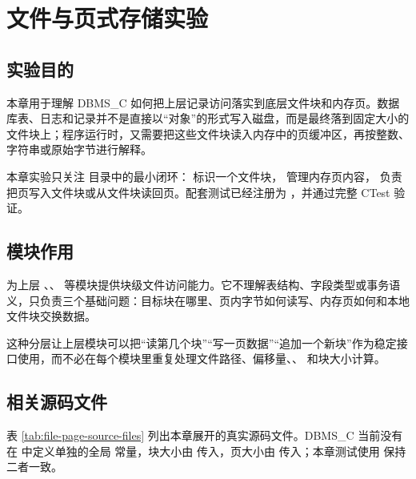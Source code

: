 \chapter{文件与页式存储实验}
\label{chap:file-page}

\section{实验目的}
\label{sec:file-page-purpose}

本章用于理解 DBMS\_C 如何把上层记录访问落实到底层文件块和内存页。数据库表、日志和记录并不是直接以“对象”的形式写入磁盘，而是最终落到固定大小的文件块上；程序运行时，又需要把这些文件块读入内存中的页缓冲区，再按整数、字符串或原始字节进行解释。

本章实验只关注  目录中的最小闭环： 标识一个文件块， 管理内存页内容， 负责把页写入文件块或从文件块读回页。配套测试已经注册为 ，并通过完整 CTest 验证。

\section{模块作用}
\label{sec:file-page-role}

 为上层 、、 等模块提供块级文件访问能力。它不理解表结构、字段类型或事务语义，只负责三个基础问题：目标块在哪里、页内字节如何读写、内存页如何和本地文件块交换数据。

这种分层让上层模块可以把“读第几个块”“写一页数据”“追加一个新块”作为稳定接口使用，而不必在每个模块里重复处理文件路径、偏移量、、 和块大小计算。

\section{相关源码文件}
\label{sec:file-page-source-files}

表 \ref{tab:file-page-source-files} 列出本章展开的真实源码文件。DBMS\_C 当前没有在  中定义单独的全局  常量，块大小由  传入，页大小由  传入；本章测试使用  保持二者一致。

